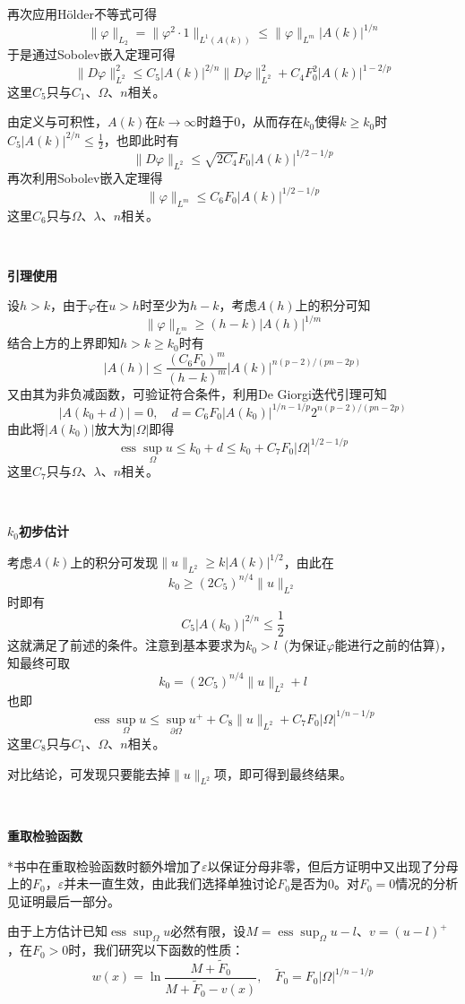 \documentclass[a4paper,UTF8,fontset=windows,AutoFakeBold]{ctexart}
\DeclareMathOperator*{\ess}{ess}
\begin{document}
{    再次应用H\"older不等式可得
    $$\|\varphi\|_{L_2}=\|\varphi^2\cdot 1\|_{L^1(A(k))}\le\|\varphi\|_{L^m}|A(k)|^{1/n}$$
    于是通过Sobolev嵌入定理可得
    $$\|D\varphi\|_{L^2}^2\le C_5|A(k)|^{2/n}\|D\varphi\|_{L^2}^2+C_4F_0^2|A(k)|^{1-2/p}$$
    这里$C_5$只与$C_1$、$\Omega$、$n$相关。
    
    由定义与可积性，$A(k)$在$k\to\infty$时趋于0，从而存在$k_0$使得$k\ge k_0$时$C_5|A(k)|^{2/n}\le\frac{1}{2}$，也即此时有
    $$\|D\varphi\|_{L^2}\le\sqrt{2C_4}F_0|A(k)|^{1/2-1/p}$$
    再次利用Sobolev嵌入定理得
    $$\|\varphi\|_{L^m}\le C_6F_0|A(k)|^{1/2-1/p}$$
    这里$C_6$只与$\Omega$、$\lambda$、$n$相关。

    \

    \textbf{引理使用}

    设$h>k$，由于$\varphi$在$u>h$时至少为$h-k$，考虑$A(h)$上的积分可知
    $$\|\varphi\|_{L^m}\ge(h-k)|A(h)|^{1/m}$$
    结合上方的上界即知$h>k\ge k_0$时有
    $$|A(h)|\le\frac{(C_6F_0)^m}{(h-k)^m}|A(k)|^{n(p-2)/(pn-2p)}$$
    又由其为非负减函数，可验证符合条件，利用De Giorgi迭代引理可知
    $$|A(k_0+d)|=0,\quad d=C_6F_0|A(k_0)|^{1/n-1/p}2^{n(p-2)/(pn-2p)}$$
    由此将$|A(k_0)|$放大为$|\Omega|$即得
    $$\ess\sup_\Omega u\le k_0+d\le k_0+C_7F_0|\Omega|^{1/2-1/p}$$
    这里$C_7$只与$\Omega$、$\lambda$、$n$相关。

    \

    \textbf{$k_0$初步估计}

    考虑$A(k)$上的积分可发现$\|u\|_{L^2}\ge k|A(k)|^{1/2}$，由此在
    $$k_0\ge(2C_5)^{n/4}\|u\|_{L^2}$$
    时即有
    $$C_5|A(k_0)|^{2/n}\le\frac{1}{2}$$
    这就满足了前述的条件。注意到基本要求为$k_0>l$\ (为保证$\varphi$能进行之前的估算)，知最终可取
    $$k_0=(2C_5)^{n/4}\|u\|_{L^2}+l$$
    也即
    $$\ess\sup_\Omega u\le\sup_{\partial\Omega}u^++C_8\|u\|_{L^2}+C_7F_0|\Omega|^{1/n-1/p}$$
    这里$C_8$只与$C_1$、$\Omega$、$n$相关。

    对比结论，可发现只要能去掉$\|u\|_{L^2}$项，即可得到最终结果。

    \

    \textbf{重取检验函数}

    *书中在重取检验函数时额外增加了$\varepsilon$以保证分母非零，但后方证明中又出现了分母上的$F_0$，$\varepsilon$并未一直生效，由此我们选择单独讨论$F_0$是否为0。对$F_0=0$情况的分析见证明最后一部分。

    由于上方估计已知$\ess\sup_\Omega u$必然有限，设$M=\ess\sup_\Omega u-l$、$v=(u-l)^+$，在$F_0>0$时，我们研究以下函数的性质：
    $$w(x)=\ln\frac{M+\tilde{F}_0}{M+\tilde{F}_0-v(x)},\quad\tilde{F}_0=F_0|\Omega|^{1/n-1/p}$$

}
\end{document}
